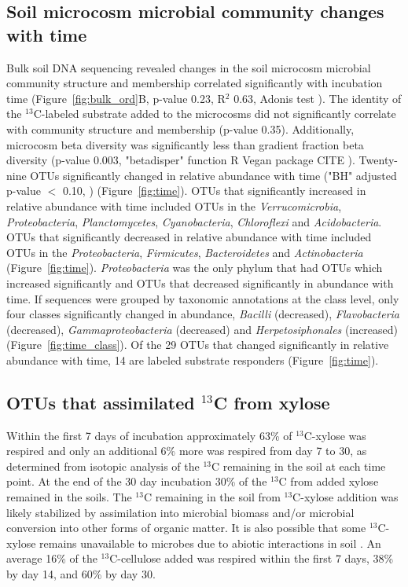 \subsection{Soil microcosm microbial community changes with time}
Bulk soil DNA sequencing revealed changes in the soil microcosm microbial
community structure and membership correlated significantly with incubation
time (Figure~\ref{fig:bulk_ord}B, p-value 0.23, R$^{2}$ 0.63, Adonis test
\citet{Anderson2001a}). The identity of the $^{13}$C-labeled substrate added to
the microcosms did not significantly correlate with community structure and
membership (p-value 0.35). Additionally, microcosm beta diversity was
significantly less than gradient fraction beta diversity (p-value 0.003,
"betadisper" function R Vegan package CITE \citet{Anderson2006}). Twenty-nine
OTUs significantly changed in relative
abundance with time ("BH" adjusted p-value $<$ 0.10, \citet{YBenjamini1995})
(Figure~\ref{fig:time}). OTUs that significantly increased in relative
abundance with time included OTUs in the \textit{Verrucomicrobia},
\textit{Proteobacteria}, \textit{Planctomycetes}, \textit{Cyanobacteria},
\textit{Chloroflexi} and \textit{Acidobacteria}. OTUs that significantly
decreased in relative abundance with time included OTUs in the
\textit{Proteobacteria}, \textit{Firmicutes}, \textit{Bacteroidetes} and
\textit{Actinobacteria} (Figure~\ref{fig:time}). \textit{Proteobacteria} was
the only phylum that had OTUs which increased significantly and OTUs that
decreased significantly in abundance with time. If sequences were grouped by
taxonomic annotations at the class level, only four classes significantly
changed in abundance, \textit{Bacilli} (decreased), \textit{Flavobacteria}
(decreased), \textit{Gammaproteobacteria} (decreased) and
\textit{Herpetosiphonales} (increased) (Figure~\ref{fig:time_class}). Of the 29 OTUs
that changed significantly in relative abundance with time, 14 are labeled
substrate responders (Figure~\ref{fig:time}).

\subsection{OTUs that assimilated $^{13}$C from xylose}
Within the first 7 days of incubation approximately 63\% of $^{13}$C-xylose was
respired and only an additional 6\% more was respired from day 7 to 30, as
determined from isotopic analysis of the $^{13}$C remaining in the soil at each
time point. At the end of the 30 day incubation 30\% of the $^{13}$C from added
xylose remained in the soils. The $^{13}$C remaining in the soil from
$^{13}$C-xylose addition was likely stabilized by assimilation into microbial
biomass and/or microbial conversion into other forms of organic matter. It is
also possible that some $^{13}$C-xylose remains unavailable to microbes due to
abiotic interactions in soil \citep{Kalbitz_2000}. An average 16\% of the
$^{13}$C-cellulose added was respired within the first 7 days, 38\% by day 14,
and 60\% by day 30.   

